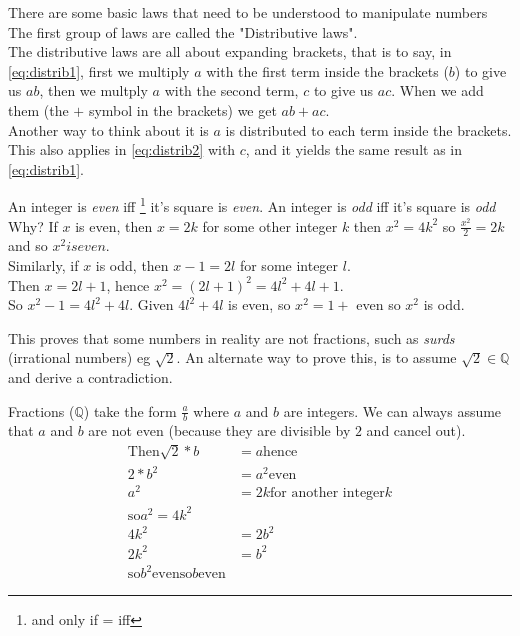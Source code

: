 There are some basic laws that need to be understood to manipulate numbers
The first group of laws are called the "Distributive laws".
\\
The distributive laws are all about expanding brackets, that is to say, in
\ref{eq:distrib1}, first we multiply $a$ with the first term inside the
brackets ($b$) to give us $ab$, then we multply $a$ with the second term, $c$
to give us $ac$. When we add them (the $+$ symbol in the brackets) we get
$ab + ac$.
\\
Another way to think about it is $a$ is distributed to each term inside the
brackets. This also applies in \ref{eq:distrib2} with $c$, and it yields the 
same result as in \ref{eq:distrib1}.

An integer is \emph{even} iff \footnote{and only if = iff} it's square is
\emph{even}. An integer is \emph{odd} iff it's square is \emph{odd} \\

Why? If $x$ is even, then $x = 2k$ for some other integer $k$ then $x^2 = 4k^2$
so $\frac{x^2}{2} = 2k$ and so $x^2 is even$.\\
Similarly, if $x$ is odd, then $x-1 = 2l$ for some integer $l$. \\
Then $x = 2l + 1$, hence $x^2 = (2l +1)^2 = 4l^2 + 4l + 1$. \\
So $x^2 - 1 = 4l^2 + 4l$. Given $4l^2 + 4l$ is even, so $x^2 = 1 + $ even so
$x^2$ is odd.

This proves that some numbers in reality are not fractions, such as \emph{surds}
(irrational numbers) eg $\sqrt{2}$. An alternate way to prove this, is to assume
$\sqrt{2} \in \mathbb{Q}$ and derive a contradiction.

Fractions ($\mathbb{Q}$) take the form $\frac{a}{b}$ where $a$ and $b$ are
integers. We can always assume that $a$ and $b$ are not even (because they are
divisible by $2$ and cancel out).\\
\begin{align}
  \text{Then} \sqrt{2}*b & = a \text{hence} \\
  2* b^2 & = a^2 \text{even} \\
  a^2 & = 2k \text{for another integer} k \\
  \text{so} a^2 = 4k^2 \\
  4k^2 & = 2b^2 \\
  2k^2 & = b^2 \\
  \text{so} b^2 \text{even}
  \text{so} b \text{even}
\end{align}

